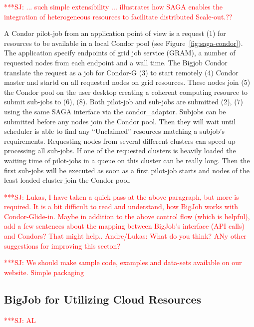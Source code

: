 \documentclass[conference,final]{IEEEtran}
\newcommand{\jhanote}[1]{ {\textcolor{red} { ***SJ: #1 }}}
\newcommand{\jhanote}[1]{}
\begin{document}
\jhanote{... such simple extensibility ... illustrates how SAGA
  enables the integration of heterogeneous resources to facilitate
  distributed Scale-out.??}

A Condor pilot-job from an application point of view is a request (1)
for resources to be available in a local Condor pool (see
Figure~\ref{fig:saga-condor}).  The application specify endpoints of
grid job service (GRAM), a number of requested nodes from each
endpoint and a wall time. The Bigjob Condor translate the request as a
job for Condor-G (3) to start remotely (4) Condor master and startd on
all requested nodes on grid resources. These nodes join (5) the Condor
pool on the user desktop creating a coherent computing resource to
submit sub-jobs to (6), (8). Both pilot-job and sub-jobs are submitted
(2), (7) using the same SAGA interface via the
condor\_adaptor. Subjobs can be submitted before any nodes join the
Condor pool. Then they will wait until scheduler is able to find any
“Unclaimed” resources matching a subjob's requirements. Requesting
nodes from several different clusters can speed-up processing all
sub-jobs. If one of the requested clusters is heavily loaded the
waiting time of pilot-jobs in a queue on this cluster can be really
long. Then the first sub-jobs will be executed as soon as a first
pilot-job starts and nodes of the least loaded cluster join the Condor
pool.

\jhanote{Lukas, I have taken a quick pass at the above paragraph, but
  more is required. It is a bit difficult to read and understand, how
  BigJob works with Condor-Glide-in. Maybe in addition to the above
  control flow (which is helpful), add a few sentences about the
  mapping between BigJob's interface (API calls) and Condors? That
  might help.. Andre/Lukas: What do you think? ANy other suggestions
  for improving this secton?}

\jhanote{We should make sample code, examples and data-sets available
  on our website. Simple packaging}

\subsection{BigJob for Utilizing Cloud Resources} \jhanote{AL}

\end{document}
